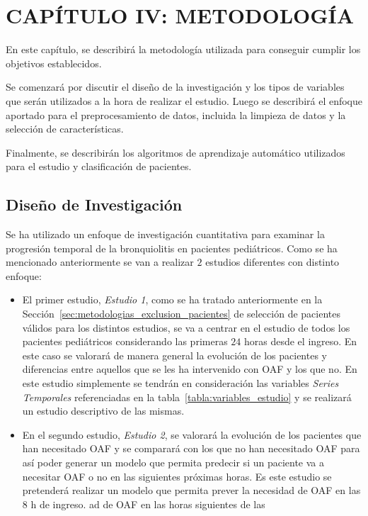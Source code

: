 \section{CAPÍTULO IV: METODOLOGÍA}\label{sec:methodology}

En este capítulo, se describirá la metodología utilizada para conseguir cumplir los objetivos establecidos. 

Se comenzará por discutir el diseño de la investigación y los tipos de variables que serán utilizados a la hora de realizar el estudio. Luego se describirá el enfoque aportado para el preprocesamiento de datos, incluida la limpieza de datos y la selección de características.

Finalmente, se describirán los algoritmos de aprendizaje automático utilizados para el estudio y clasificación de pacientes. 

\subsection{Diseño de Investigación}

Se ha utilizado un enfoque de investigación cuantitativa para examinar la progresión temporal de la bronquiolitis en pacientes pediátricos. Como se ha mencionado anteriormente se van a realizar $2$ estudios diferentes con distinto enfoque:

\begin{itemize}
    \item El primer estudio, \textit{Estudio 1}, como se ha tratado anteriormente en la Sección~\ref{sec:metodologias_exclusion_pacientes} de selección de pacientes válidos para los distintos estudios, se va a centrar en el estudio de todos los pacientes pediátricos considerando las primeras $24$ horas desde el ingreso. En este caso se valorará de manera general la evolución de los pacientes y diferencias entre aquellos que se les ha intervenido con OAF y los que no. En este estudio simplemente se tendrán en consideración las variables \textit{Series Temporales} referenciadas en la tabla~\ref{tabla:variables_estudio} y se realizará un estudio descriptivo de las mismas.
    \item  En el segundo estudio, \textit{Estudio 2}, se valorará la evolución de los pacientes que han necesitado OAF y se comparará con los que no han necesitado OAF para así poder generar un modelo que permita predecir si un paciente va a necesitar OAF o no en las siguientes próximas horas. Es este estudio se pretenderá realizar un modelo que permita prever la necesidad de OAF en las 8 h de ingreso. ad de OAF en las horas siguientes de las 
\end{itemize}

